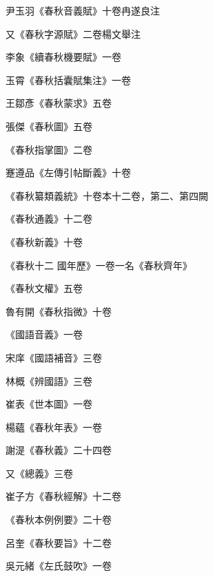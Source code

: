 \begin{pinyinscope}
 尹玉羽《春秋音義賦》十卷冉遂良注



 又《春秋字源賦》二卷楊文舉注



 李象《續春秋機要賦》一卷



 玉霄《春秋括囊賦集注》一卷



 王鄒彥《春秋蒙求》五卷



 張傑《春秋圖》五卷



 《春秋指掌圖》二卷



 蹇遵品《左傳引帖斷義》十卷



 《春秋纂類義統》十卷本十二卷，第二、第四闕



 《春秋通義》十二卷



 《春秋新義》十卷



 《春秋十二
 國年歷》一卷一名《春秋齊年》



 《春秋文權》五卷



 魯有開《春秋指微》十卷



 《國語音義》一卷



 宋庠《國語補音》三卷



 林概《辨國語》三卷



 崔表《世本圖》一卷



 楊蘊《春秋年表》一卷



 謝湜《春秋義》二十四卷



 又《總義》三卷



 崔子方《春秋經解》十二卷



 《春秋本例例要》二十卷



 呂奎《春秋要旨》十二卷



 吳元緒《左氏鼓吹》一卷




\end{pinyinscope}
